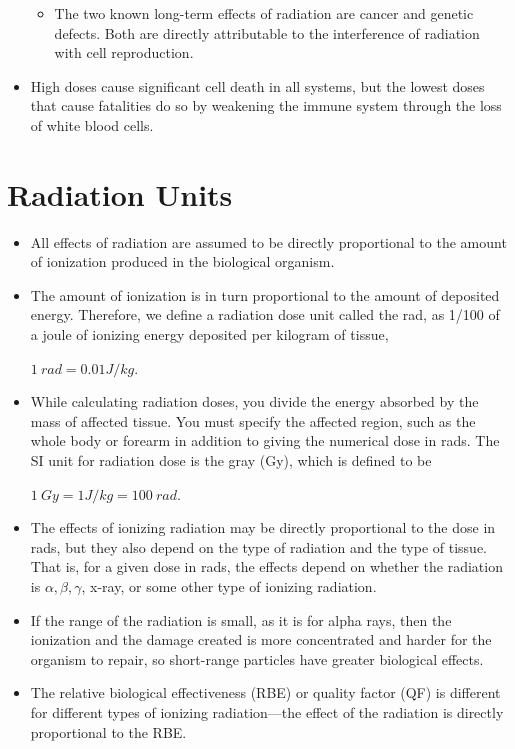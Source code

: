 \documentclass[12pt]{book}
\begin{document}
\begin{itemize}
\begin{itemize}
\item
The two known long-term effects of radiation are cancer and genetic defects. Both are directly attributable to the interference of radiation with cell reproduction.
    \end{itemize}

\item  High doses cause significant cell death in all systems, but the lowest doses that cause fatalities do so by weakening the immune system through the loss of white blood cells.
\end{itemize}

\chapter{Radiation Units}

\begin{itemize}
    \item  All effects of radiation are assumed to be directly proportional to the amount of ionization produced in the biological organism.
    \item The amount of ionization is in turn proportional to the amount of deposited energy. Therefore, we define a radiation dose unit called the rad, as 1/100 of a joule of ionizing energy deposited per kilogram of tissue,

$1 \ rad = 0.01 J/kg$.

\item While calculating radiation doses, you divide the energy absorbed by the mass of affected tissue. You must specify the affected region, such as the whole body or forearm in addition to giving the numerical dose in rads. The SI unit for radiation dose is the gray (Gy), which is defined to be

$1 \ Gy =1 J/kg = 100 \ rad$.

\item The effects of ionizing radiation may be directly proportional to the dose in rads, but they also depend on the type of radiation and the type of tissue. That is, for a given dose in rads, the effects depend on whether the radiation is $\alpha, \beta, \gamma $, x-ray, or some other type of ionizing radiation.

\item If the range of the radiation is small, as it is for alpha rays, then the ionization and the damage created is more concentrated and harder for the organism to repair, so short-range particles have greater biological effects.
\item
The relative biological effectiveness (RBE) or quality factor (QF) is different for different types of ionizing radiation—the effect of the radiation is directly proportional to the RBE.


\end{itemize}
\end{document}
